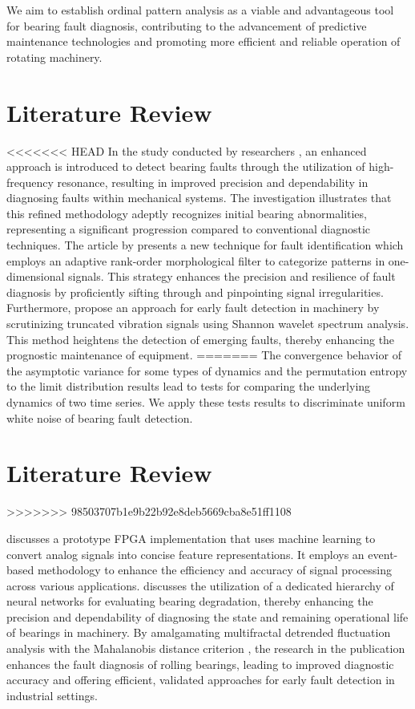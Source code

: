 \documentclass[sn-basic,pdflatex]{sn-jnl}
\theoremstyle{remark}
\theoremstyle{definition}
\begin{document}
We aim to establish ordinal pattern analysis as a viable and
advantageous tool for bearing fault diagnosis, contributing to the
advancement of predictive maintenance technologies and promoting more
efficient and reliable operation of rotating machinery.

\section{Literature Review}\label{sec2}

<<<<<<< HEAD
In the study conducted by researchers \citet{WOS:000312724900101}, an
enhanced approach is introduced to detect bearing faults through the
utilization of high-frequency resonance, resulting in improved precision
and dependability in diagnosing faults within mechanical systems. The
investigation illustrates that this refined methodology adeptly
recognizes initial bearing abnormalities, representing a significant
progression compared to conventional diagnostic techniques. The article
by \citet{WOS:000301688000008} presents a new technique for fault
identification which employs an adaptive rank-order morphological filter
to categorize patterns in one-dimensional signals. This strategy
enhances the precision and resilience of fault diagnosis by proficiently
sifting through and pinpointing signal irregularities. Furthermore,
\citet{WOS:000303039300034} propose an approach for early fault
detection in machinery by scrutinizing truncated vibration signals using
Shannon wavelet spectrum analysis. This method heightens the detection
of emerging faults, thereby enhancing the prognostic maintenance of
equipment.
=======
The convergence behavior of the asymptotic variance for some types of
dynamics and the permutation entropy to the limit distribution results
lead to tests for comparing the underlying dynamics of two time
series\citep{REY2024115481}. We apply these tests results to
discriminate uniform white noise of bearing fault detection.

\section{Literature Review}\label{sec3}
>>>>>>> 98503707b1e9b22b92e8deb5669cba8e51ff1108

\citet{WOS:000345844100102} discusses a prototype FPGA implementation
that uses machine learning to convert analog signals into concise
feature representations. It employs an event-based methodology to
enhance the efficiency and accuracy of signal processing across various
applications. \citet{WOS:000396580800080} discusses the utilization of a
dedicated hierarchy of neural networks for evaluating bearing
degradation, thereby enhancing the precision and dependability of
diagnosing the state and remaining operational life of bearings in
machinery. By amalgamating multifractal detrended fluctuation analysis
with the Mahalanobis distance criterion \citep{WOS:000320835800016}, the
research in the publication enhances the fault diagnosis of rolling
bearings, leading to improved diagnostic accuracy and offering
efficient, validated approaches for early fault detection in industrial
settings.
\end{document}
